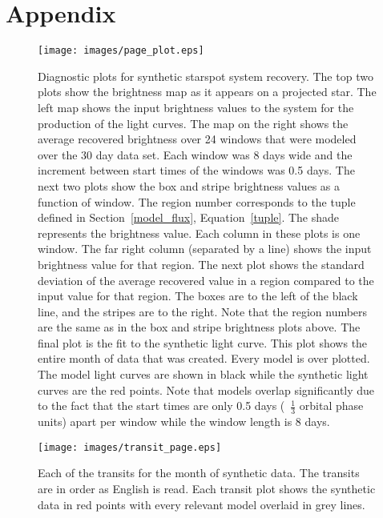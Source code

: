 

\section{Appendix \label{appendix}}
\clearpage
\begin{figure}
	\texttt{[image: images/page\_plot.eps]}
	\caption{Diagnostic plots for synthetic starspot system recovery. The top two plots show the brightness map as it appears on a projected star. The left map shows the input brightness values to the system for the production of the light curves. The map on the right shows the average recovered brightness over 24 windows that were modeled over the 30 day data set. Each window was 8 days wide and the increment between start times of the windows was 0.5 days. The next two plots show the box and stripe brightness values as a function of window. The region number corresponds to the tuple defined in Section~\ref{model_flux}, Equation~\ref{tuple}. The shade represents the brightness value. Each column in these plots is one window. The far right column (separated by a line) shows the input brightness value for that region. The next plot shows the standard deviation of the average recovered value in a region compared to the input value for that region. The boxes are to the left of the black line, and the stripes are to the right. Note that the region numbers are the same as in the box and stripe brightness plots above. The final plot is the fit to the synthetic light curve. This plot shows the entire month of data that was created. Every model is over plotted. The model light curves are shown in black while the synthetic light curves are the red points. Note that models overlap significantly due to the fact that the start times are only 0.5 days (~$\frac{1}{3}$ orbital phase units) apart per window while the window length is 8 days.}
	\label{page_1b}
\end{figure}
\clearpage
\begin{figure}
	\texttt{[image: images/transit\_page.eps]}
	\caption{Each of the transits for the month of synthetic data. The transits are in order as English is read. Each transit plot shows the synthetic data in red points with every relevant model overlaid in grey lines.}
	\label{transits_1b}
\end{figure}


